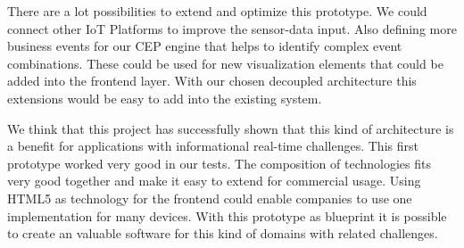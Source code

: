 \documentclass{acm_proc_article-sp}
\begin{document}
There are a lot possibilities to extend and optimize this prototype. We could connect other IoT Platforms to improve the sensor-data input. Also defining more business events for our CEP engine that helps to identify complex event combinations. These could be used for new visualization elements that could be added into the frontend layer.
With our chosen decoupled architecture this extensions would be easy to add into the existing system.

We think that this project has successfully shown that this kind of architecture is a benefit for applications with informational real-time challenges. This first prototype worked very good in our tests. The composition of technologies fits very good together and make it easy to extend for commercial usage. Using HTML5 as technology for the frontend could enable companies to use one implementation for many devices. 
With this prototype as blueprint it is possible to create an valuable software for this kind of domains with related challenges.


%

%
%
\appendix
\end{document}
